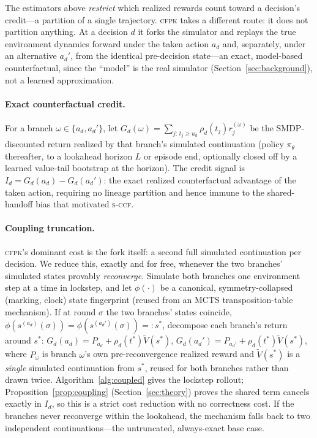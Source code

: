 \documentclass[review,authoryear,3p,times]{elsarticle}
\newcommand{\sccf}{\textsc{s-ccf}}
\newcommand{\cfpk}{\textsc{cfpk}}
\begin{document}
The estimators above \emph{restrict} which realized rewards count toward a
decision's credit---a partition of a single trajectory. \cfpk{} takes a
different route: it does not partition anything. At a decision $d$ it forks
the simulator and replays the true environment dynamics forward under the
taken action $a_d$ and, separately, under an alternative $a_d'$, from the
identical pre-decision state---an exact, model-based counterfactual, since
the ``model'' is the real simulator (Section~\ref{sec:background}), not a
learned approximation.

\paragraph{Exact counterfactual credit.} For a branch $\omega\in\{a_d,a_d'\}$,
let $G_d(\omega)=\sum_{j:\,t_j\ge u_d}\rho_d(t_j)r_j^{(\omega)}$ be the
SMDP-discounted return realized by that branch's simulated continuation
(policy $\pi_\theta$ thereafter, to a lookahead horizon $L$ or episode end,
optionally closed off by a learned value-tail bootstrap at the horizon). The
credit signal is $I_d = G_d(a_d)-G_d(a_d')$: the exact realized counterfactual
advantage of the taken action, requiring no lineage partition and hence
immune to the shared-handoff bias that motivated \sccf.

\paragraph{Coupling truncation.} \cfpk's dominant cost is the fork itself: a
second full simulated continuation per decision. We reduce this, exactly and
for free, whenever the two branches' simulated states provably
\emph{reconverge}. Simulate both branches one environment step at a time in
lockstep, and let $\phi(\cdot)$ be a canonical, symmetry-collapsed
(marking, clock) state fingerprint (reused from an MCTS transposition-table
mechanism). If at round $\sigma$ the two branches' states coincide,
$\phi(s^{(a_d)}(\sigma))=\phi(s^{(a_d')}(\sigma))=:s^{*}$, decompose each
branch's return around $s^{*}$: $G_d(a_d)=P_{a_d}+\rho_d(t^{*})\tilde V(s^{*})$,
$G_d(a_d')=P_{a_d'}+\rho_d(t^{*})\tilde V(s^{*})$, where $P_\omega$ is branch
$\omega$'s own pre-reconvergence realized reward and $\tilde V(s^{*})$ is a
\emph{single} simulated continuation from $s^{*}$, reused for both branches
rather than drawn twice. Algorithm~\ref{alg:coupled} gives the lockstep
rollout; Proposition~\ref{prop:coupling} (Section~\ref{sec:theory}) proves the
shared term cancels exactly in $I_d$, so this is a strict cost reduction with
no correctness cost. If the branches never reconverge within the lookahead,
the mechanism falls back to two independent continuations---the
untruncated, always-exact base case.
\end{document}
